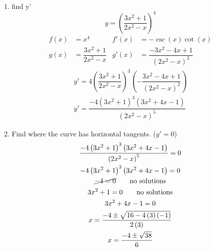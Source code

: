 \begin{example}\hspace{\textwidth}\\
    \begin{enumerate}[a\symbol{41}] %
        \item find y'
            \begin{equation*}
                y = \left(\dfrac{3x^2 + 1}{2x^2 - x}\right)^4
            \end{equation*}
            \begin{align*}
                f(x) &= x^4                        & f'(x) &= -\csc(x)\cot(x)\\
                g(x) &= \dfrac{3x^2 + 1}{2x^2 - x} & g'(x) &= \dfrac{-3x^2 - 4x + 1}{\left(2x^2 - x\right)^2}
            \end{align*}
            \begin{gather*}
                y' = 4\left(\dfrac{3x^2 + 1}{2x^2 - x}\right)^3\left(-\dfrac{3x^2 - 4x + 1}{\left(2x^2 - x\right)^2}\right) \\
                y' = \dfrac{-4 \left(3x^2 + 1\right)^3\left(3x^2 + 4x - 1\right)}{\left(2x^2 - x\right)^5}
            \end{gather*}
        \item Find where the curve has horizontal tangents. ($y' = 0$)
        \begin{gather*}
            \dfrac{-4 \left(3x^2 + 1\right)^3\left(3x^2 + 4x - 1\right)}{\left(2x^2 - x\right)^5} = 0 \\
            -4 \left(3x^2 + 1\right)^3\left(3x^2 + 4x - 1\right) = 0 \\
            \cancel{-4 = 0} \qquad \text{no solutions} \\
            3x^2 + 1 = 0 \qquad \text{no solutions} \\
            3x^2 + 4x - 1 = 0 \\
            x = \dfrac{-4 \pm \sqrt{16 -4\left(3\right)\left(-1\right)}}{2\left(3\right)} \\
            x = \dfrac{-4 \pm \sqrt{38}}{6}
        \end{gather*}
    \end{enumerate}
\end{example}
